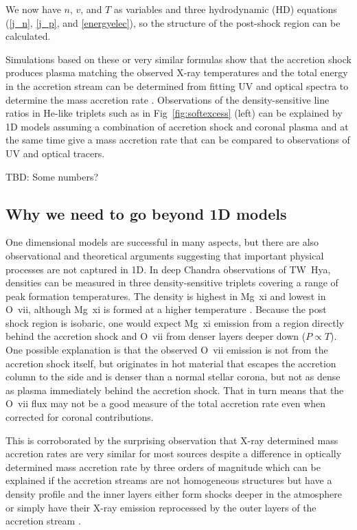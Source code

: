 We now have $n$, $v$, and $T$ as variables and three hydrodynamic (HD) equations (\ref{j_n}, \ref{j_p}, and \ref{energyelec}), so the structure of the post-shock region can be calculated.

Simulations based on these or very similar formulas show that the accretion shock produces plasma matching the observed X-ray temperatures \citep{lamzin_1998} and the total energy in the accretion stream can be determined from fitting UV and optical spectra to determine the mass accretion rate \citep{calvet_1998}. Observations of the density-sensitive line ratios in He-like triplets such as in Fig~\ref{fig:softexcess} (left) can be explained by 1D models assuming a combination of accretion shock and coronal plasma \cite{Guenther_2007} and at the same time give a mass accretion rate that can be compared to observations of UV and optical tracers.


{\color{red} TBD: Some numbers?}

\subsection{Why we need to go beyond 1D models}
One dimensional models are successful in many aspects, but there are also observational and theoretical arguments suggesting that important physical processes are not captured in 1D. In deep Chandra observations of TW~Hya, densities can be measured in three density-sensitive triplets covering a range of peak formation temperatures. The density is highest in Mg~{\sc xi} and lowest in O~{\sc vii}, although Mg~{\sc xi} is formed at a higher temperature \cite{Brickhouse_2010}. Because the post shock region is isobaric, one would expect Mg~{\sc xi} emission from a region directly behind the accretion shock and O~{\sc vii} from denser layers deeper down ($P\propto T$). One possible explanation is that the observed O~{\sc vii} emission is not from the accretion shock itself, but originates in hot material that escapes the accretion column to the side and is denser than a normal stellar corona, but not as dense as plasma immediately behind the accretion shock. That in turn means that the O~{\sc vii} flux may not be a good measure of the total accretion rate even when corrected for coronal contributions.

This is corroborated by the surprising observation that X-ray determined mass accretion rates are very similar for most sources despite a difference in optically determined mass accretion rate by three orders of magnitude \cite{2011A&A...526A.104C} which can be explained if the accretion streams are not homogeneous structures but have a density profile and the inner layers either form shocks deeper in the atmosphere or simply have their X-ray emission reprocessed by the outer layers of the accretion stream \cite{Sacco_2010,Schneider_2018,2021Natur.597...41E}.

